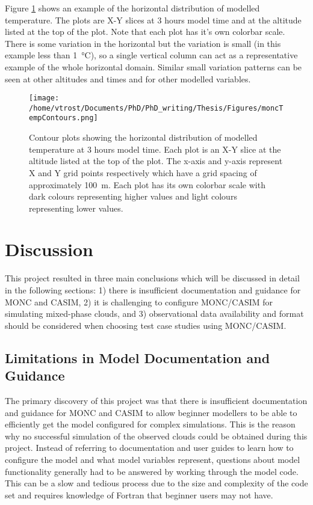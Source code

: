 \newpage
Figure \ref{fig:tempContour} shows an example of the horizontal distribution of modelled temperature. The plots are X-Y slices at 3 hours model time and at the altitude listed at the top of the plot. Note that each plot has it's own colorbar scale. There is some variation in the horizontal but the variation is small (in this example less than \SI{1}{\degreeCelsius}), so a single vertical column can act as a representative example of the whole horizontal domain. Similar small variation patterns can be seen at other altitudes and times and for other modelled variables.

\begin{figure}[H]
	\centering
	\texttt{[image: /home/vtrost/Documents/PhD/PhD\_writing/Thesis/Figures/moncTempContours.png]}
	\caption{Contour plots showing the horizontal distribution of modelled temperature at 3 hours model time. Each plot is an X-Y slice at the altitude listed at the top of the plot. The x-axis and y-axis represent X and Y grid points respectively which have a grid spacing of approximately \SI{100}{m}. Each plot has its own colorbar scale with dark colours representing higher values and light colours representing lower values.}
	\label{fig:tempContour}
\end{figure}

\chapter{Discussion} \label{ch:discussion}
This project resulted in three main conclusions which will be discussed in detail in the following sections: 1) there is insufficient documentation and guidance for MONC and CASIM, 2) it is challenging to configure MONC/CASIM for simulating mixed-phase clouds, and 3) observational data availability and format should be considered when choosing test case studies using MONC/CASIM.

\section{Limitations in Model Documentation and Guidance}
The primary discovery of this project was that there is insufficient documentation and guidance for MONC and CASIM to allow beginner modellers to be able to efficiently get the model configured for complex simulations. This is the reason why no successful simulation of the observed clouds could be obtained during this project. Instead of referring to documentation and user guides to learn how to configure the model and what model variables represent, questions about model functionality generally had to be answered by working through the model code. This can be a slow and tedious process due to the size and complexity of the code set and requires knowledge of Fortran that beginner users may not have.

